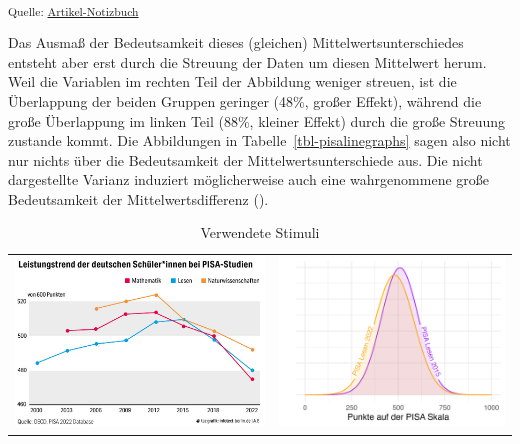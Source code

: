 \documentclass[
  jou,
  floatsintext,
  longtable,
  nolmodern,
  notxfonts,
  notimes,
  colorlinks=true,linkcolor=blue,citecolor=blue,urlcolor=blue]{apa7}
\begin{document}
\textsubscript{Quelle:
\href{https://sammerk.github.io/StudienergebnisseBesserKommunizieren/index.qmd.html}{Artikel-Notizbuch}}

Das Ausmaß der Bedeutsamkeit dieses (gleichen) Mittelwertsunterschiedes
entsteht aber erst durch die Streuung der Daten um diesen Mittelwert
herum. Weil die Variablen im rechten Teil der Abbildung weniger streuen,
ist die Überlappung der beiden Gruppen geringer (48\%, großer Effekt),
während die große Überlappung im linken Teil (88\%, kleiner Effekt)
durch die große Streuung zustande kommt. Die Abbildungen in
Tabelle~\ref{tbl-pisalinegraphs} sagen also nicht nur nichts über die
Bedeutsamkeit der Mittelwertsunterschiede aus. Die nicht dargestellte
Varianz induziert möglicherweise auch eine wahrgenommene große
Bedeutsamkeit der Mittelwertsdifferenz ().

\begin{ThreePartTable}

\begin{longtable}[]{@{}
  >{\raggedright\arraybackslash}p{}
  >{\raggedright\arraybackslash}p{}@{}}
\caption{Verwendete Stimuli}\label{tbl-materials}\tabularnewline
\toprule\noalign{}
\endfirsthead
\endhead
\bottomrule\noalign{}
\endlastfoot
\includegraphics[width=4.16667in,height=\textheight,keepaspectratio]{img/taz.jpeg}
&
\includegraphics[width=3.78125in,height=\textheight,keepaspectratio]{img/geomtextline.png} \\
\end{longtable}

\end{ThreePartTable}
\end{document}
